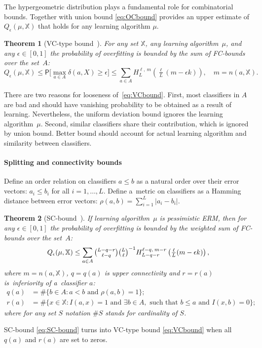 \documentclass{article} %
\def\XX{\mathbb{X}}
\def\CC_#1^#2{\tbinom{#1}{#2}}
\def\eps{\epsilon}
\providecommand{\Prob}{\mathsf{P}}
\newcommand{\hypergeom}[5]{{#1}_{#2}^{#4,\:#3}\left(#5\right)}
\newcommand{\Hyper}[4]{\hypergeom{H}{#1}{#2}{#3}{#4}}
\newtheorem{theorem}{Theorem}
\begin{document}
The hypergeometric distribution plays a fundamental role for combinatorial bounds.
Together with union bound \eqref{eq:OCbound} provides an upper estimate of $Q_\eps(\mu, \XX)$ that holds for any learning algorithm $\mu$.
\begin{theorem}[VC-type bound~\cite{voron11premi}]
\label{thOneAlg2}
    For any set $\XX$,
    any learning algorithm~$\mu$,
    and any $\eps\in [0,1]$
    the probability of overfitting is bounded by the sum of FC-bounds over the set~$A$:
    \begin{equation}
    \label{eq:VCbound}
        Q_\eps(\mu, \XX)
        \leq
        \Prob\bigl[
        \max_{a \in A}\delta(a, X) \geq \eps
        \bigr]
        \leq
        \sum_{a\in A}
        \Hyper{L}{m}{\ell}{ \tfrac{\ell}{L} (m-\eps k) },
        \quad
        m = n(a,\XX).
    \end{equation}
\end{theorem}
There are two reasons for looseness of~\eqref{eq:VCbound}.
First, most classifiers in $A$ are bad and
should have vanishing probability to be obtained as a result of learning.
Nevertheless, the uniform deviation bound ignores the learning algorithm~$\mu$.
Second, similar classifiers share their contribution, which is ignored by union bound.
Better bound should account for actual learning algorithm and similarity between classifiers.

\paragraph{Splitting and connectivity bounds}
Define an order relation on classifiers $a\leq b$ as a natural order over their error vectors:
$a_i \leq b_i$ for all $i=1,\ldots,L$.
Define a~metric on classifiers as a Hamming distance between error vectors:
$\rho(a,b) = \sum_{i=1}^L |a_i-b_i|$.

\begin{theorem}[SC-bound~\cite{voron11premi}]
\label{th:SC-bound}
    If learning algorithm~$\mu$ is pessimistic ERM, then for any $\eps\in[0,1]$
    the probability of overfitting is bounded by the weighted sum of FC-bounds over the set~$A$:
    \begin{equation}
    \label{eq:SC-bound}
        Q_\eps(\mu,\XX)
        \leq
        \sum_{a\in A}
            {\CC_{L-q-r}^{\ell-q}}{\CC_{L}^{\ell}}^{-1}
            \Hyper{L-q-r}{m-r}{\ell-q}{\tfrac\ell L (m - \eps k)},
    \end{equation}
    where $m = n(a,\XX)$,
    $q = q(a)$ is upper connectivity and $r = r(a)$ is~inferiority of a~classifier $a$:
    \begin{align*}
        q(a) &= \#\{b \in A \colon a < b \text{ and } \rho(a, b) = 1\};
    \\
        r(a) &= \#\{x \in \XX \colon I(a, x) = 1 \text { and } \exists b \in A, \text { such that } b \leq a \text{ and } I(x, b) = 0\};
    \end{align*}
    where for any set $S$ notation $\#S$ stands for cardinality of $S$.
\end{theorem}
SC-bound \eqref{eq:SC-bound} turns into VC-type bound \eqref{eq:VCbound} when all $q(a)$ and $r(a)$ are set to zeros.
\end{document}
